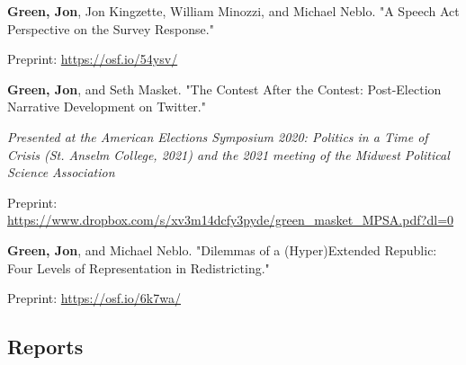 \documentclass[letterpaper]{article}
\renewenvironment{itemize}{
  \begin{list}{}{
    \setlength{\leftmargin}{1.5em}
  }
}{
  \end{list}
}
\begin{document}
\begin{itemize}
\item \textbf{Green, Jon}, Jon Kingzette, William Minozzi, and Michael Neblo. "A Speech Act Perspective on the Survey Response." 
\begin{itemize}
\item Preprint: \url{https://osf.io/54ysv/}
\end{itemize}

\item \textbf{Green, Jon}, and Seth Masket. "The Contest After the Contest: Post-Election Narrative Development on Twitter." 
\begin{itemize}
\item \textit{Presented at the American Elections Symposium 2020: Politics in a Time of Crisis (St. Anselm College, 2021) and the 2021 meeting of the Midwest Political Science Association}
\item Preprint: \url{https://www.dropbox.com/s/xv3m14dcfy3pyde/green_masket_MPSA.pdf?dl=0}
\end{itemize}

\item \textbf{Green, Jon}, and Michael Neblo. "Dilemmas of a (Hyper)Extended Republic: Four Levels of Representation in Redistricting." 
\begin{itemize}
\item Preprint: \url{https://osf.io/6k7wa/}
\end{itemize}

\end{itemize}

\subsection*{Reports}
\end{document}
